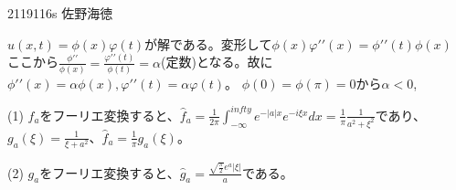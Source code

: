\documentclass[11pt]{jsarticle}
\begin{document}
2119116s 佐野海徳\\
    \par $u(x,t) = \phi(x)\varphi(t)$が解である。変形して$\phi(x)\varphi{\prime\prime}(x) = \phi{\prime\prime}(t)\phi(x)$
ここから$\frac{\phi{\prime\prime}}{\phi(x)} = \frac{\varphi{\prime\prime}(t)}{\phi(t)} = \alpha$(定数)となる。故に$\phi{\prime\prime}(x) = \alpha\phi(x), \varphi{\prime\prime}(t) = \alpha\varphi(t)$。
    $\phi(0) = \phi(\pi) = 0$から$\alpha < 0$,
\par(1) $f_a$をフーリエ変換すると、$\hat{f}_a = \frac{1}{2\pi}\int_{-\infty}^{infty}e^{-|a|x} e^{-i\xi x} dx = \frac{1}{\pi}\frac{1}{a^2 + \xi^2}$であり、$g_a(\xi) = \frac{1}{\xi + a^2}$、$\hat{f}_a = \frac{1}{\pi}g_a(\xi)$。
\par(2) $g_a$をフーリエ変換すると、$\hat{g}_a = \frac{\sqrt{\frac{\pi}{2}}e^a|\xi|}{a}$である。
\end{document}
